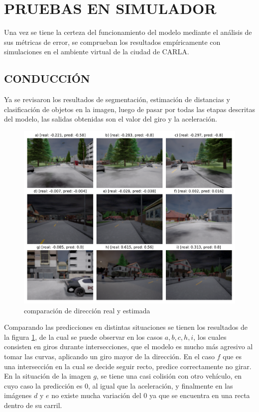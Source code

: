 \section{PRUEBAS EN SIMULADOR} \label{pruebas-simulador}
Una vez se tiene la certeza del funcionamiento del modelo mediante el análisis de sus métricas de error, se comprueban los resultados empíricamente con simulaciones en el ambiente virtual de la ciudad de CARLA.
\subsection{CONDUCCIÓN}
Ya se revisaron los resultados de segmentación, estimación de distancias y clasificación de objetos en la imagen, luego de pasar por todas las etapas descritas del modelo, las salidas obtenidas son el valor del giro y la aceleración.

\begin{figure}[H]
	\centering
	\includegraphics[scale=0.63]{imagenes/preds/steer}
	\caption[Comparación de Dirección Real y Estimada]{comparación de dirección real y estimada}
	\label{steer}
\end{figure}

Comparando las predicciones en distintas situaciones se tienen los resultados de la figura \ref{steer}, de la cual se puede observar en los casos $a, b, c, h, i$, los cuales consisten en giros durante intersecciones, que el modelo es mucho más agresivo al tomar las curvas, aplicando un giro mayor de la dirección. En el caso $f$ que es una intersección en la cual se decide seguir recto, predice correctamente no girar. En la situación de la imagen $g$, se tiene una casi colisión con otro vehículo, en cuyo caso la predicción es 0, al igual que la aceleración, y finalmente en las imágenes $d$ y $e$ no existe mucha variación del $0$ ya que se encuentra en una recta dentro de su carril.

